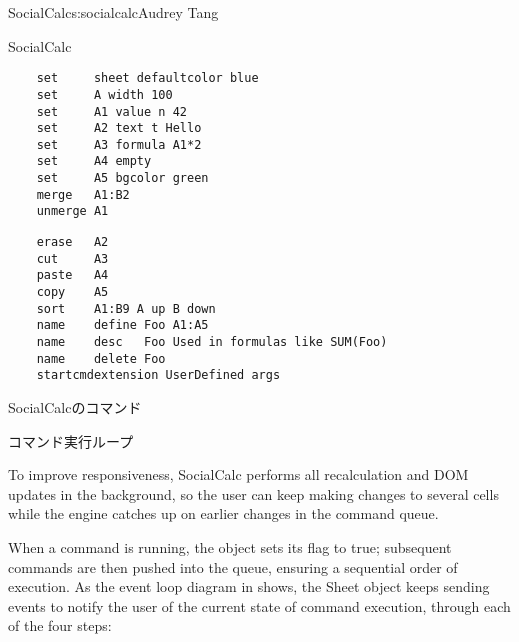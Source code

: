 \begin{aosachapter}{SocialCalc}{s:socialcalc}{Audrey Tang}
\begin{aosasect1}{SocialCalc}
\begin{table}[ht]
\begin{minipage}[b]{0.4\linewidth}\centering

\begin{verbatim}
    set     sheet defaultcolor blue
    set     A width 100
    set     A1 value n 42
    set     A2 text t Hello
    set     A3 formula A1*2
    set     A4 empty
    set     A5 bgcolor green
    merge   A1:B2
    unmerge A1
\end{verbatim}

\end{minipage}
\hspace{0.5cm}
\begin{minipage}[b]{0.6\linewidth}
\centering

\begin{verbatim}
    erase   A2
    cut     A3
    paste   A4
    copy    A5
    sort    A1:B9 A up B down
    name    define Foo A1:A5
    name    desc   Foo Used in formulas like SUM(Foo)
    name    delete Foo
    startcmdextension UserDefined args
\end{verbatim}

\end{minipage}
\caption{SocialCalcのコマンド}
\label{tbl.soc.commands}
\end{table}

\end{aosasect1}

\begin{aosasect1}{コマンド実行ループ}

To improve responsiveness, SocialCalc performs all recalculation and
DOM updates in the background, so the user can keep making changes to
several cells while the engine catches up on earlier changes in the
command queue.


When a command is running, the  object sets its
 flag to true; subsequent commands are then pushed into the
 queue, ensuring a sequential order of
execution.  As the event loop diagram in 
shows, the Sheet object keeps sending  events to
notify the user of the current state of command execution, through
each of the four steps:


\end{aosasect1}
\end{aosachapter}
